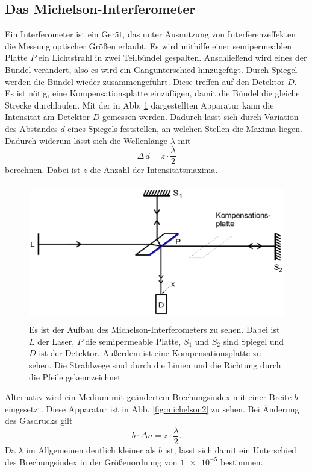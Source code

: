 \subsection{Das Michelson-Interferometer}
Ein Interferometer ist ein Gerät, das unter Ausnutzung von Interferenzeffekten die 
Messung optischer Größen erlaubt. 
Es wird mithilfe einer semipermeablen Platte $P$ ein Lichtstrahl in zwei Teilbündel 
gespalten. Anschließend wird eines der Bündel verändert, also es wird ein Gangunterschied hinzugefügt. Durch Spiegel werden die Bündel wieder zusammengeführt. Diese treffen auf den Detektor $D$.
Es ist nötig, eine Kompensationsplatte einzufügen, damit die Bündel die gleiche Strecke
durchlaufen.
Mit der in Abb. \ref{fig:michelson} dargestellten Apparatur kann die Intensität am 
Detektor $D$ gemessen werden. Dadurch lässt sich durch Variation des Abstandes $d$ eines Spiegels feststellen, an welchen Stellen die Maxima liegen. Dadurch widerum lässt sich die 
Wellenlänge $\lambda$ mit 
\begin{equation}
    \Delta \, d = z \cdot \frac{\lambda}{2}
    \label{eqn:lambda}
\end{equation}
berechnen. Dabei ist $z$ die Anzahl der Intensitätsmaxima.

\begin{figure}
    \centering
    \includegraphics[width=12cm, height=6cm]{build/michelson.png}
    \caption{Es ist der Aufbau des Michelson-Interferometers zu sehen. Dabei ist $L$ der Laser, $P$ die semipermeable Platte, $S_1$ und $S_2$ sind Spiegel und $D$ ist der Detektor. Außerdem ist eine Kompensationsplatte zu sehen. Die Strahlwege sind durch die Linien und die Richtung durch die Pfeile gekennzeichnet. \cite{V401}}
    \label{fig:michelson}
\end{figure}

\noindent Alternativ wird ein Medium mit geändertem Brechungsindex mit einer Breite $b$ eingesetzt.
Diese Apparatur ist in Abb. \ref{fig:michelson2} zu sehen.
Bei Änderung des Gasdrucks gilt
\begin{equation}
    b \cdot \Delta n = z \cdot \frac{\lambda}{2}.
    \label{eqn:deltan}
\end{equation}
Da $\lambda$ im Allgemeinen deutlich kleiner als $b$ ist, lässt sich damit ein 
Unterschied des Brechungsindex in der Größenordnung von $\num{1e-5}$ bestimmen.

